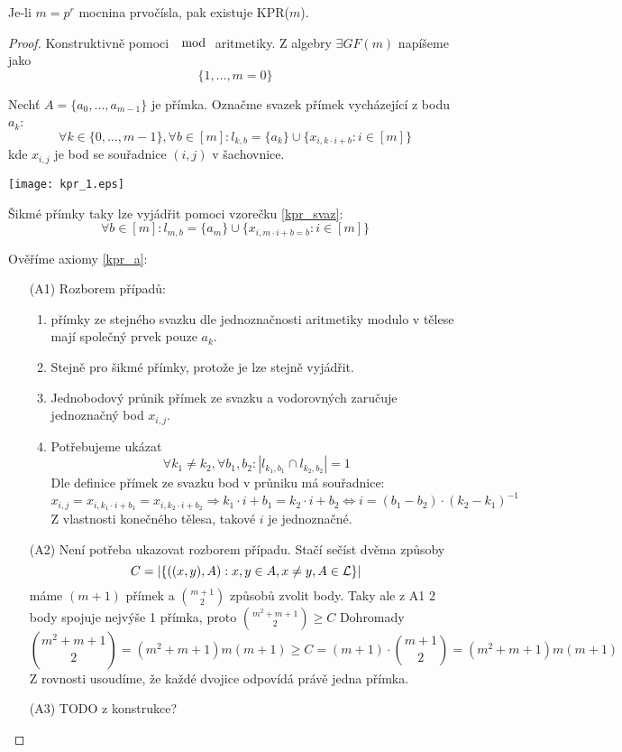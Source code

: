 \begin{theorem}
    Je-li $m=p^r$ mocnina prvočísla, pak existuje KPR($m$).
\end{theorem}
\begin{proof}
	Konstruktivně pomoci $\mod$ aritmetiky.
	Z algebry $\exists GF(m)$ napíšeme jako
	\[ \{ 1, \ldots, m = 0 \} \]

	Nechť $A = \{ a_0, \ldots, a_{m - 1} \}$ je přímka.
	Označme svazek přímek vycházející z bodu $a_k$:
	\begin{equation}\label{kpr_svaz}
		\forall k \in \{ 0, \ldots, m - 1 \}, \forall b \in [m]: l_{k, b} = \{ a_k \} \cup \{ x_{i, k\cdot i + b}: i \in [m] \}
	\end{equation}
	kde $x_{i, j}$ je bod se souřadnice $(i, j)$ v šachovnice.

	\texttt{[image: kpr\_1.eps]}

	Šikmé přímky taky lze vyjádřit pomoci vzorečku \eqref{kpr_svaz}:
	\[ \forall b \in [m]: l_{m, b} = \{ a_m \} \cup \{ x_{i, m\cdot i + b = b}: i \in [m] \} \]

	Ověříme axiomy \cref{kpr_a}:
    	\begin{itemize}
    	    \item[(A1)] Rozborem případů:
		    \begin{enumerate}
			    \item přímky ze stejného svazku dle jednoznačnosti aritmetiky modulo v tělese mají společný prvek pouze $a_k$.
			    \item Stejně pro šikmé přímky, protože je lze stejně vyjádřit.
			    \item Jednobodový průnik přímek ze svazku a vodorovných zaručuje jednoznačný bod $x_{i, j}$.
			    \item Potřebujeme ukázat
				    \[ \forall k_1 \ne k_2, \forall b_1, b_2: |l_{k_1, b_1} \cap l_{k_2, b_2}| = 1 \]
				    Dle definice přímek ze svazku bod v průniku má souřadnice:
				    \[ x_{i, j} = x_{i, k_1 \cdot i + b_1} = x_{i, k_2 \cdot i + b_2} \Rightarrow k_1 \cdot i + b_1 = k_2 \cdot i + b_2 \iff i = (b_1 - b_2) \cdot (k_2 - k_1)^{-1} \]
				    Z vlastnosti konečného tělesa, takové $i$ je jednoznačné.
		    \end{enumerate}
    	    \item[(A2)] Není potřeba ukazovat rozborem případu. Stačí sečíst dvěma způsoby
		    \[ C = |\{ ((x, y), A) : x, y \in A, x \ne y, A \in \operatorname{\mathcal{L}} \}| \]
		    máme $(m + 1)$ přímek a $\binom{m + 1}{2}$ způsobů zvolit body.
		    Taky ale z A1 2 body spojuje nejvýše 1 přímka, proto $\binom{m^2 + m + 1}{2} \geq C$
		    Dohromady
		    \[ \binom{m^2 + m + 1}{2} = (m^2 + m + 1) m (m + 1) \geq C = (m + 1) \cdot \binom{m + 1}{2} = (m^2 + m + 1) m (m + 1) \]
		    Z rovnosti usoudíme, že každé dvojice odpovídá právě jedna přímka.
    	    \item[(A3)] TODO z konstrukce?
    	\end{itemize}
\end{proof}
